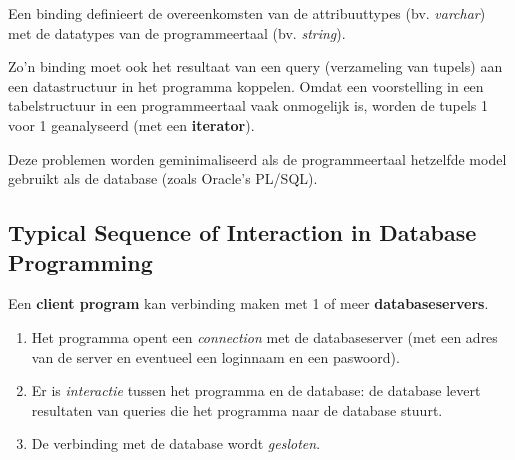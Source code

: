 Een binding definieert de overeenkomsten van de attribuuttypes (bv. \textit{varchar}) met de datatypes van de programmeertaal (bv. \textit{string}).

Zo'n binding moet ook het resultaat van een query (verzameling van tupels) aan een datastructuur in het programma koppelen. Omdat een voorstelling in een tabelstructuur in een programmeertaal vaak onmogelijk is, worden de tupels 1 voor 1 geanalyseerd (met een \textbf{iterator}).

Deze problemen worden geminimaliseerd als de programmeertaal hetzelfde model gebruikt als de database (zoals Oracle's PL/SQL). 

\subsection{Typical Sequence of Interaction in Database Programming}
Een \textbf{client program} kan verbinding maken met 1 of meer \textbf{databaseservers}.
\begin{enumerate}
	\item Het programma opent een \textit{connection} met de databaseserver (met een adres van de server en eventueel een loginnaam en een paswoord).
	\item Er is \textit{interactie} tussen het programma en de database: de database levert resultaten van queries die het programma naar de database stuurt.
	\item De verbinding met de database wordt \textit{gesloten}.
\end{enumerate}
